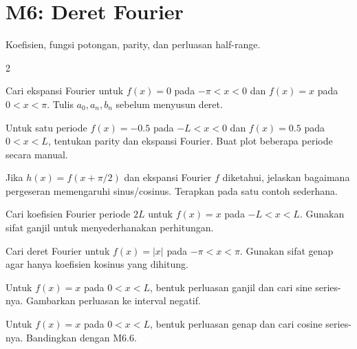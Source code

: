 \documentclass[10pt,a4paper]{article}
\newcommand{\level}[1]{\colorbox{levelbg}{\scriptsize\strut #1}}
\newcommand{\src}[1]{\colorbox{sourcebg}{\scriptsize\strut #1}}
\begin{document}
\section*{M6: Deret Fourier}
{\color{iteraGray}\small Koefisien, fungsi potongan, parity, dan perluasan half-range.}\par\vspace{1mm}
\begin{multicols}{2}
\begin{qbox}[title={M6.1: Fourier fungsi potongan I\hfill \level{L3}\;\src{PR}}]
\small Cari ekspansi Fourier untuk $f(x)=0$ pada $-\pi<x<0$ dan $f(x)=x$ pada $0<x<\pi$. Tulis $a_0,a_n,b_n$ sebelum menyusun deret.
\end{qbox}
\begin{qbox}[title={M6.2: Fourier gelombang kotak\hfill \level{L3}\;\src{PR}}]
\small Untuk satu periode $f(x)=-0.5$ pada $-L<x<0$ dan $f(x)=0.5$ pada $0<x<L$, tentukan parity dan ekspansi Fourier. Buat plot beberapa periode secara manual.
\end{qbox}
\begin{qbox}[title={M6.3: Pergeseran fungsi\hfill \level{L3}\;\src{PR}}]
\small Jika $h(x)=f(x+\pi/2)$ dan ekspansi Fourier $f$ diketahui, jelaskan bagaimana pergeseran memengaruhi sinus/cosinus. Terapkan pada satu contoh sederhana.
\end{qbox}
\begin{qbox}[title={M6.4: Periode $2L$\hfill \level{L3}\;\src{Var}}]
\small Cari koefisien Fourier periode $2L$ untuk $f(x)=x$ pada $-L<x<L$. Gunakan sifat ganjil untuk menyederhanakan perhitungan.
\end{qbox}
\begin{qbox}[title={M6.5: Fungsi genap\hfill \level{L3}\;\src{Var}}]
\small Cari deret Fourier untuk $f(x)=|x|$ pada $-\pi<x<\pi$. Gunakan sifat genap agar hanya koefisien kosinus yang dihitung.
\end{qbox}
\begin{qbox}[title={M6.6: Half-range sine series\hfill \level{L3}\;\src{Var}}]
\small Untuk $f(x)=x$ pada $0<x<L$, bentuk perluasan ganjil dan cari sine series-nya. Gambarkan perluasan ke interval negatif.
\end{qbox}
\begin{qbox}[title={M6.7: Half-range cosine series\hfill \level{L3}\;\src{Var}}]
\small Untuk $f(x)=x$ pada $0<x<L$, bentuk perluasan genap dan cari cosine series-nya. Bandingkan dengan M6.6.
\end{qbox}
\begin{qbox}[title={M6.8: Nilai di titik diskontinu\hfill \level{L3}\;\src{Var}}]

\end{qbox}
\end{multicols}
\end{document}
